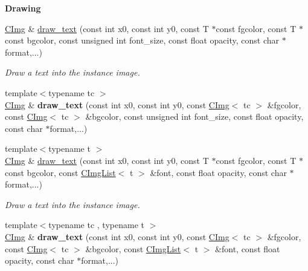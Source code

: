 \begin{Indent}{\bf Drawing}
\begin{DoxyCompactItemize}
\item 
\hyperlink{structcimg__library_1_1_c_img}{C\-Img} \& \hyperlink{structcimg__library_1_1_c_img_ad5c3a182af6af463efe7769cbcb7b726}{draw\-\_\-text} (const int x0, const int y0, const T $\ast$const fgcolor, const T $\ast$const bgcolor, const unsigned int font\-\_\-size, const float opacity, const char $\ast$format,...)
\begin{DoxyCompactList}\small\item\em Draw a text into the instance image. \end{DoxyCompactList}\item 
\hypertarget{structcimg__library_1_1_c_img_a0bbd896858d1debc018c16720564981c}{{\footnotesize template$<$typename tc $>$ }\\\hyperlink{structcimg__library_1_1_c_img}{C\-Img} \& {\bfseries draw\-\_\-text} (const int x0, const int y0, const \hyperlink{structcimg__library_1_1_c_img}{C\-Img}$<$ tc $>$ \&fgcolor, const \hyperlink{structcimg__library_1_1_c_img}{C\-Img}$<$ tc $>$ \&bgcolor, const unsigned int font\-\_\-size, const float opacity, const char $\ast$format,...)}\label{structcimg__library_1_1_c_img_a0bbd896858d1debc018c16720564981c}

\item 
{\footnotesize template$<$typename t $>$ }\\\hyperlink{structcimg__library_1_1_c_img}{C\-Img} \& \hyperlink{structcimg__library_1_1_c_img_af9de022ffcd5a5e569817e140223549c}{draw\-\_\-text} (const int x0, const int y0, const T $\ast$const fgcolor, const T $\ast$const bgcolor, const \hyperlink{structcimg__library_1_1_c_img_list}{C\-Img\-List}$<$ t $>$ \&font, const float opacity, const char $\ast$format,...)
\begin{DoxyCompactList}\small\item\em Draw a text into the instance image. \end{DoxyCompactList}\item 
\hypertarget{structcimg__library_1_1_c_img_a5a4dbd446d14925d6d8fed664c004400}{{\footnotesize template$<$typename tc , typename t $>$ }\\\hyperlink{structcimg__library_1_1_c_img}{C\-Img} \& {\bfseries draw\-\_\-text} (const int x0, const int y0, const \hyperlink{structcimg__library_1_1_c_img}{C\-Img}$<$ tc $>$ \&fgcolor, const \hyperlink{structcimg__library_1_1_c_img}{C\-Img}$<$ tc $>$ \&bgcolor, const \hyperlink{structcimg__library_1_1_c_img_list}{C\-Img\-List}$<$ t $>$ \&font, const float opacity, const char $\ast$format,...)}\label{structcimg__library_1_1_c_img_a5a4dbd446d14925d6d8fed664c004400}


\end{DoxyCompactItemize}
\end{Indent}
